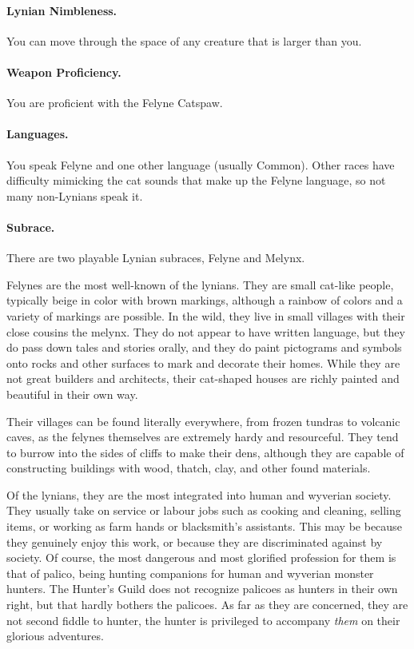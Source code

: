 \paragraph{Lynian Nimbleness.} You can move through the space of any creature that is larger than you.

\paragraph{Weapon Proficiency.} You are proficient with the Felyne Catspaw.

\paragraph{Languages.} You speak Felyne and one other language (usually Common). Other races have difficulty mimicking the cat sounds that make up the Felyne language, so not many non-Lynians speak it.

\paragraph{Subrace.} There are two playable Lynian subraces, Felyne and Melynx.


Felynes are the most well-known of the lynians.  They are small cat-like people, typically beige in color with brown markings, although a rainbow of colors and a variety of markings are possible. In the wild, they live in small villages with their close cousins the melynx. They do not appear to have written language, but they do pass down tales and stories orally, and they do paint pictograms and symbols onto rocks and other surfaces to mark and decorate their homes. While they are not great builders and architects, their cat-shaped houses are richly painted and beautiful in their own way.

Their villages can be found literally everywhere, from frozen tundras to volcanic caves, as the felynes themselves are extremely hardy and resourceful. They tend to burrow into the sides of cliffs to make their dens, although they are capable of constructing buildings with wood, thatch, clay, and other found materials.

Of the lynians, they are the most integrated into human and wyverian society. They usually take on service or labour jobs such as cooking and cleaning, selling items, or working as farm hands or blacksmith's assistants. This may be because they genuinely enjoy this work, or because they are discriminated against by society. Of course, the most dangerous and most glorified profession for them is that of palico, being hunting companions for human and wyverian monster hunters. The Hunter's Guild does not recognize palicoes as hunters in their own right, but that hardly bothers the palicoes. As far as they are concerned, they are not second fiddle to hunter, the hunter is privileged to accompany \textit{them} on their glorious adventures.

